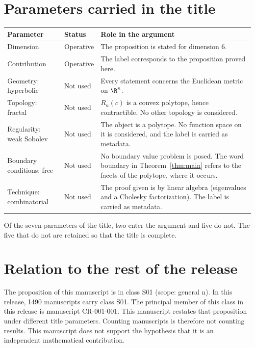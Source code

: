 \documentclass[11pt]{article}
\begin{document}
\section{Parameters carried in the title}\label{sec:params}
\begin{center}
\small
\begin{tabular}{p{}p{}p{}}
\toprule
Parameter & Status & Role in the argument \\
\midrule
Dimension & Operative & The proposition is stated for dimension $6$. \\
Contribution & Operative & The label corresponds to the proposition proved here. \\
Geometry: hyperbolic & Not used & Every statement concerns the Euclidean metric on $\R^n$. \\
Topology: fractal & Not used & $R_n(c)$ is a convex polytope, hence contractible. No other topology is considered. \\
Regularity: weak Sobolev & Not used & The object is a polytope. No function space on it is considered, and the label is carried as metadata. \\
Boundary conditions: free & Not used & No boundary value problem is posed. The word boundary in Theorem~\ref{thm:main} refers to the facets of the polytope, where it occurs. \\
Technique: combinatorial & Not used & The proof given is by linear algebra (eigenvalues and a Cholesky factorization). The label is carried as metadata. \\
\bottomrule
\end{tabular}
\end{center}
Of the seven parameters of the title, two enter the argument and five do not. The five that do not are retained so that the title is complete.

\section{Relation to the rest of the release}
The proposition of this manuscript is in class S01 (scope: general n).
In this release, 1490 manuscripts carry class S01. The principal member of this class in this release is manuscript CR-001-001. This manuscript restates that proposition under different title parameters.
Counting manuscripts is therefore not counting results. This manuscript does not support the hypothesis that it is an independent mathematical contribution.
\end{document}
